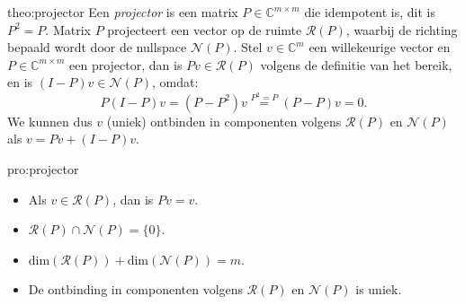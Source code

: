 \begin{theo}[Projector]{theo:projector}
    Een \emph{projector} is een matrix $P \in \mathbb{C}^{m \times m}$ die idempotent is, dit is $P^2 = P$. Matrix $P$ projecteert een vector op de ruimte $\mathcal{R}(P)$, waarbij de richting bepaald wordt door de nullspace $\mathcal{N}(P)$. Stel $v \in \mathbb{C}^m$ een willekeurige vector en $P \in \mathbb{C}^{m \times m}$ een projector, dan is $Pv \in \mathcal{R}(P)$ volgens de definitie van het bereik, en is $(I - P)v \in \mathcal{N}(P)$, omdat:
    \begin{equation*}
        P(I - P)v = (P - P^2)v \overset{P^2 = P}{=} (P-P)v = 0.
    \end{equation*}
    We kunnen dus $v$ (uniek) ontbinden in componenten volgens $\mathcal{R}(P)$ en $\mathcal{N}(P)$ als
        $v = Pv + (I - P)v$.
\end{theo}

\newpage


\begin{pro}[Projector]{pro:projector}
    \begin{itemize}
        \item Als $v \in \mathcal{R}(P)$, dan is $Pv = v$.
        \item $\mathcal{R}(P) \cap \mathcal{N}(P) = \{0\}$.
        \item $\text{dim}(\mathcal{R}(P)) + \text{dim}(\mathcal{N}(P)) = m$.
        \item De ontbinding in componenten volgens $\mathcal{R}(P)$ en $\mathcal{N}(P)$ is uniek.
    \end{itemize}
\end{pro}

